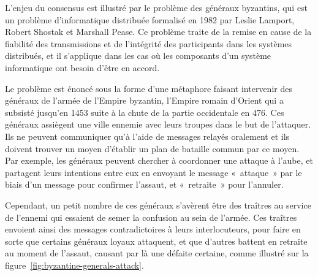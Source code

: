 
L'enjeu du consensus est illustré par le problème des généraux byzantins, qui est un problème d'informatique distribuée formalisé en 1982 par Leslie Lamport, Robert Shostak et Marshall Pease. Ce problème traite de la remise en cause de la fiabilité des transmissions et de l'intégrité des participants dans les systèmes distribués, et il s'applique dans les cas où les composants d'un système informatique ont besoin d'être en accord.

Le problème est énoncé sous la forme d'une métaphore faisant intervenir des généraux de l'armée de l'Empire byzantin, l'Empire romain d'Orient qui a subsisté jusqu'en 1453 suite à la chute de la partie occidentale en 476. Ces généraux assiègent une ville ennemie avec leurs troupes dans le but de l'attaquer. Ils ne peuvent communiquer qu'à l'aide de messages relayés oralement et ils doivent trouver un moyen d'établir un plan de bataille commun par ce moyen. Par exemple, les généraux peuvent chercher à coordonner une attaque à l'aube, et partagent leurs intentions entre eux en envoyant le message «~attaque~» par le biais d'un message pour confirmer l'assaut, et «~retraite~» pour l'annuler. %


Cependant, un petit nombre de ces généraux s'avèrent être des traîtres au service de l'ennemi qui essaient de semer la confusion au sein de l'armée. Ces traîtres envoient ainsi des messages contradictoires à leurs interlocuteurs, pour faire en sorte que certains généraux loyaux attaquent, et que d'autres battent en retraite au moment de l'assaut, causant par là une défaite certaine, comme illustré sur la figure~\ref{fig:byzantine-generals-attack}.


